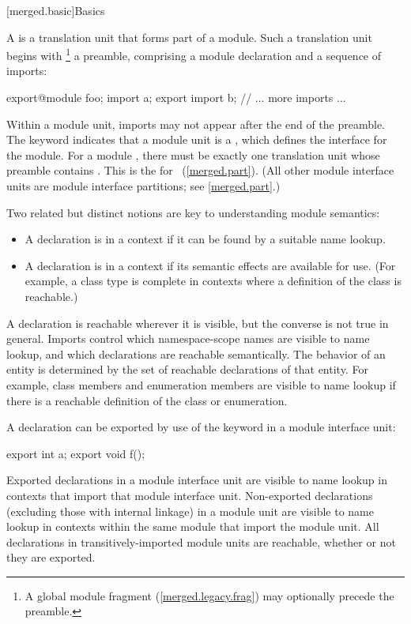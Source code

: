 [merged.basic]{Basics}

\pnum
A  is a translation unit that forms part of a module.
Such a translation unit begins with%
\footnote{A global module fragment (\ref{merged.legacy.frag}) may optionally
precede the preamble.}
a preamble,
comprising a module declaration
and a sequence of imports:

\begin{codeblock}
export@\opt@ module foo;
import a;
export import b;
// ... more imports ...
\end{codeblock}

Within a module unit, imports may not appear after the end of the preamble.
The  keyword indicates that a module unit is a
, which defines the interface for the module.
For a module , there must be exactly one
translation unit whose preamble contains .
This is the 
for ~(\ref{merged.part}).
(All other module interface units are module interface partitions;
see \ref{merged.part}.)

\pnum
Two related but distinct notions are key to understanding module semantics:
\begin{itemize}
\item A declaration is  in a context if it can be found by a
suitable name lookup.
\item A declaration is  in a context if its semantic effects
are available for use. (For example, a class type is complete in contexts
where a definition of the class is reachable.)
\end{itemize}
A declaration is reachable wherever it is visible, but the converse is not true
in general.
Imports control which namespace-scope names are visible to name lookup,
and which declarations are reachable semantically.
The behavior of an entity is determined by
the set of reachable declarations of that entity.
For example, class members and enumeration members are visible to name lookup
if there is a reachable definition of the class or enumeration.
 
\pnum
A declaration can be exported by use of the  keyword
in a module interface unit:
\begin{codeblock}
export int a;
export {
void f();
}
\end{codeblock}
Exported declarations in a module interface unit
are visible to name lookup
in contexts that import that module interface unit.
Non-exported declarations (excluding those with internal linkage)
in a module unit
are visible to name lookup
in contexts within the same module that import the module unit.
All declarations in transitively-imported module units
are reachable, whether or not they are exported.

